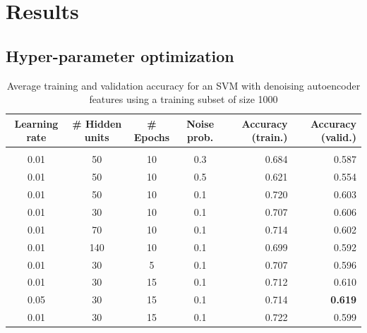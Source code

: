 \documentclass{article} %
\begin{document}
\section{Results}
\subsection{Hyper-parameter optimization}
\begin{table}[h]
\caption{Average training and validation accuracy for an SVM with denoising autoencoder features using a training subset of size 1000}
\label{results-table}
\begin{center}
\begin{adjustbox}{width=1\textwidth}
\begin{tabular}{cccc|rr}

\multicolumn{1}{c}{\bf Learning rate}  
&\multicolumn{1}{c}{\bf \# Hidden units}  
&\multicolumn{1}{c}{\bf \# Epochs} 
&\multicolumn{1}{c}{\bf Noise prob.} 
&\multicolumn{1}{|r}{\bf Accuracy (train.)}
&\multicolumn{1}{r}{\bf Accuracy (valid.)}
\\ \hline \\	
0.01 & 50 & 10 & 0.3 & 0.684 & 0.587 \\
0.01 & 50 & 10 & 0.5 & 0.621 & 0.554 \\
0.01 & 50 & 10 & 0.1 & 0.720 & 0.603 \\
0.01 & 30 & 10 & 0.1 & 0.707 & 0.606 \\
0.01 & 70 & 10 & 0.1 & 0.714 & 0.602 \\
0.01 & 140 & 10 & 0.1 & 0.699 & 0.592 \\
0.01 & 30 & 5 & 0.1 & 0.707 & 0.596 \\
0.01 & 30 & 15 & 0.1 & 0.712 & 0.610 \\
0.05 & 30 & 15 & 0.1 & 0.714 & \textbf{0.619} \\
0.01 & 30 & 15 & 0.1 & 0.722 & 0.599 \\

\end{tabular}
\end{adjustbox}
\end{center}
\end{table}
\end{document}
